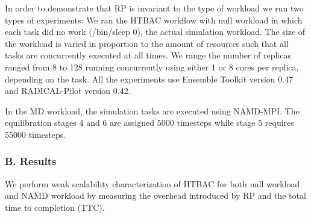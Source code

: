 In order to demonstrate that RP is invariant to the type of workload we run two types of experiments: We ran the HTBAC workflow with null workload in which each task did no work (/bin/sleep 0), the actual simulation workload. The size of the workload is varied in proportion to the amount of resources such that all tasks are concurrently executed at all times. We range the number of replicas ranged from 8 to 128 running concurrently using either 1 or 8 cores per replica, depending on the task. All the experiments use Ensemble Toolkit version 0.47 and RADICAL-Pilot version 0.42.

In the MD workload, the simulation tasks are executed using NAMD-MPI. The equilibration stages 4 and 6 are assigned 5000 timesteps while stage 5 requires 55000 timesteps. 

\subsubsection{B. Results}

We perform weak scalability characterization of HTBAC for both null workload and NAMD workload by measuring the overhead introduced by RP and the total time to completion (TTC). 



